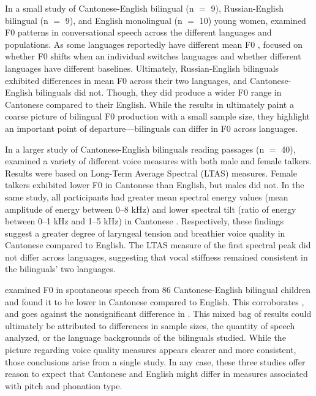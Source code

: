 In a small study of Cantonese-English bilingual (n $=$ 9), Russian-English bilingual (n $=$ 9), and English monolingual (n $=$ 10) young women, \citet{altenberg_2006_f0} examined F0 patterns in conversational speech across the different languages and populations. As some languages reportedly have different mean F0 \citep[e.g.,][]{keating_2012_f0}, \citet{altenberg_2006_f0} focused on whether F0 shifts when an individual switches languages and whether different languages have different baselines. Ultimately, Russian-English bilinguals exhibited differences in mean F0 across their two languages, and Cantonese-English bilinguals did not. Though, they did produce a wider F0 range in Cantonese compared to their English. While the results in \citet{altenberg_2006_f0} ultimately paint a coarse picture of bilingual F0 production with a small sample size, they highlight an important point of departure---bilinguals can differ in F0 across languages. 

In a larger study of Cantonese-English bilinguals reading passages (n $=$ 40), \citet{ng_2012_ltas} examined a variety of different voice measures with both male and female talkers. Results were based on Long-Term Average Spectral (LTAS) measures. Female talkers exhibited lower F0 in Cantonese than English, but males did not. In the same study, all participants had greater mean spectral energy values (mean amplitude of energy between 0--8 kHz) and lower spectral tilt (ratio of energy between 0--1 kHz and 1--5 kHz) in Cantonese \citep{ng_2012_ltas}. Respectively, these findings suggest a greater degree of laryngeal tension and breathier voice quality in Cantonese compared to English. The LTAS measure of the first spectral peak did not differ across languages, suggesting that vocal stiffness remained consistent in the bilinguals' two languages. 

\citet{ng_2010_voice} examined F0 in spontaneous speech from 86 Cantonese-English bilingual children and found it to be lower in Cantonese compared to English. This corroborates \citet{ng_2012_ltas}, and goes against the nonsignificant difference in \citet{altenberg_2006_f0}. This mixed bag of results could ultimately be attributed to differences in sample sizes, the quantity of speech analyzed, or the language backgrounds of the bilinguals studied. While the picture regarding voice quality measures appears clearer and more consistent, those conclusions arise from a single study. In any case, these three studies offer reason to expect that Cantonese and English might differ in measures associated with pitch and phonation type. 

